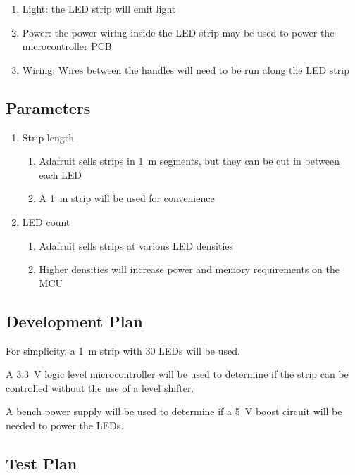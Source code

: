 \documentclass{notes}
\begin{document}
\begin{enumerate}
    \item Light: the LED strip will emit light
    \item Power: the power wiring inside the LED strip may be used to power the microcontroller PCB
    \item Wiring: Wires between the handles will need to be run along the LED strip
\end{enumerate}

\subsection{Parameters}

\begin{enumerate}
    \item Strip length
          \begin{enumerate}
              \item Adafruit sells strips in \SI{1}{\meter} segments, but they can be cut in between each LED
              \item A \SI{1}{\meter} strip will be used for convenience
          \end{enumerate}
    \item LED count
          \begin{enumerate}
              \item Adafruit sells strips at various LED densities
              \item Higher densities will increase power and memory requirements on the MCU
          \end{enumerate}
\end{enumerate}

\subsection{Development Plan}

For simplicity, a \SI{1}{\meter} strip with 30 LEDs will be used.

A \SI{3.3}{\volt} logic level microcontroller will be used to determine if the strip can be controlled without the use of a level shifter.

A bench power supply will be used to determine if a \SI{5}{\volt} boost circuit will be needed to power the LEDs.

\subsection{Test Plan}
\label{sec:fr1testplan}
\end{document}
